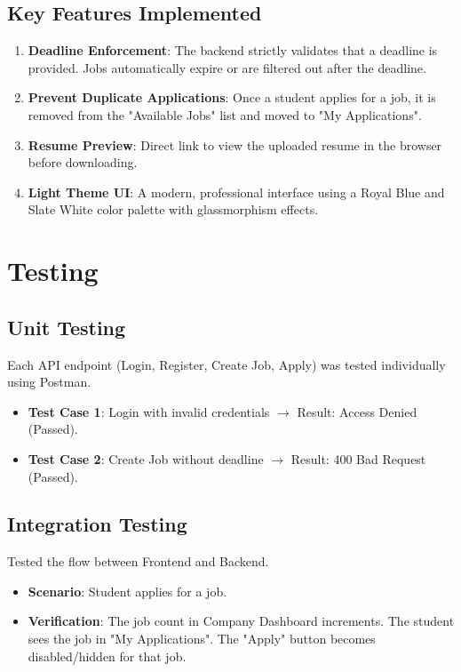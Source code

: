 \documentclass[12pt, a4paper]{report}
\begin{document}
\section{Key Features Implemented}
\begin{enumerate}
    \item \textbf{Deadline Enforcement}: The backend strictly validates that a deadline is provided. Jobs automatically expire or are filtered out after the deadline.
    \item \textbf{Prevent Duplicate Applications}: Once a student applies for a job, it is removed from the "Available Jobs" list and moved to "My Applications".
    \item \textbf{Resume Preview}: Direct link to view the uploaded resume in the browser before downloading.
    \item \textbf{Light Theme UI}: A modern, professional interface using a Royal Blue and Slate White color palette with glassmorphism effects.
\end{enumerate}

\chapter{Testing}

\section{Unit Testing}
Each API endpoint (Login, Register, Create Job, Apply) was tested individually using Postman.
\begin{itemize}
    \item \textbf{Test Case 1}: Login with invalid credentials $\rightarrow$ Result: Access Denied (Passed).
    \item \textbf{Test Case 2}: Create Job without deadline $\rightarrow$ Result: 400 Bad Request (Passed).
\end{itemize}

\section{Integration Testing}
Tested the flow between Frontend and Backend.
\begin{itemize}
    \item \textbf{Scenario}: Student applies for a job.
    \item \textbf{Verification}: The job count in Company Dashboard increments. The student sees the job in "My Applications". The "Apply" button becomes disabled/hidden for that job.
\end{itemize}
\end{document}
